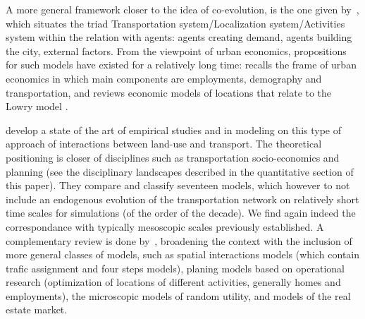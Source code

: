 \documentclass[10pt]{article}
\begin{document}

A more general framework closer to the idea of co-evolution, is the one given by~\cite{le2010approche}, which situates the triad Transportation system/Localization system/Activities system within the relation with agents: agents creating demand, agents building the city, external factors. From the viewpoint of urban economics, propositions for such models have existed for a relatively long time: \cite{putman1975urban} recalls the frame of urban economics in which main components are employments, demography and transportation, and reviews economic models of locations that relate to the Lowry model \cite{lowry1964model}.



\cite{wegener2004land} develop a state of the art of empirical studies and in modeling on this type of approach of interactions between land-use and transport. The theoretical positioning is closer of disciplines such as transportation socio-economics and planning (see the disciplinary landscapes described in the quantitative section of this paper). They compare and classify seventeen models, which however to not include an endogenous evolution of the transportation network on relatively short time scales for simulations (of the order of the decade). We find again indeed the correspondance with typically mesoscopic scales previously established. A complementary review is done by~\cite{chang2006models}, broadening the context with the inclusion of more general classes of models, such as spatial interactions models (which contain trafic assignment and four steps models), planing models based on operational research (optimization of locations of different activities, generally homes and employments), the microscopic models of random utility, and models of the real estate market.
\end{document}
